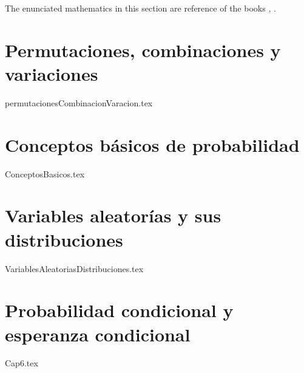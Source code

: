 The enunciated mathematics in this section are reference of the books \cite{Liliana2012}, \cite{Brualdi2009}.
\section{Permutaciones, combinaciones y variaciones}
{permutacionesCombinacionVaracion.tex}
\section{Conceptos b\'asicos de probabilidad}
{ConceptosBasicos.tex}
\section{Variables aleator\'ias y sus distribuciones}
{VariablesAleatoriasDistribuciones.tex}
\section{Probabilidad condicional y esperanza condicional}
{Cap6.tex}
